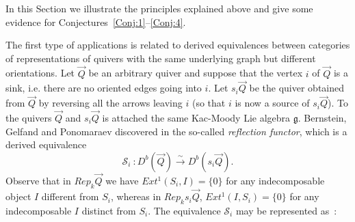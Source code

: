 \documentclass[a4paper,10pt]{amsart}
\def\g{\mathfrak{g}}
\numberwithin{equation}{section}
\begin{document}
{\vspace{.15in}

In this Section we illustrate the principles explained above and give some evidence for  Conjectures~\ref{Conj:1}--\ref{Conj:4}.

\vspace{.1in}

The first type of applications is related to derived equivalences between categories of representations of quivers with the same underlying graph but different orientations. Let $\vec{Q}$ be an arbitrary quiver and suppose that the vertex $i$ of $\vec{Q}$ is a sink, i.e. there are no oriented edges going into $i$. Let $s_i\vec{Q}$ be the quiver obtained from $\vec{Q}$ by reversing all the arrows leaving $i$ (so that $i$ is now a source of $s_i\vec{Q}$). To the quivers $\vec{Q}$ and $s_i\vec{Q}$ is attached the same Kac-Moody Lie algebra $\g$. Bernstein, Gelfand and Ponomaraev discovered in
\cite{BGP}  the so-called \textit{reflection functor}, which is a derived equivalence
$$\mathcal{S}_i~: D^b(\vec{Q}) \stackrel{\sim}{\to} D^b(s_i\vec{Q}).$$
Observe that in $Rep_k\vec{Q}$ we have $Ext^1(S_i,I)=\{0\}$ for any indecomposable object $I$ different from $S_i$, whereas in $Rep_ks_i\vec{Q}$, $Ext^1(I,S_i)=\{0\}$ for any indecomposable $I$ distinct from $S_i$. The equivalence $\mathcal{S}_i$ may be represented as~:

\vspace{.3in}

}
\end{document}
